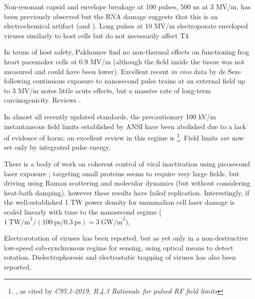 \documentclass[paper.tex]{subfiles}
\begin{document}
Non-resonant capsid and envelope breakage at 100 pulses, 500 ns at 3 MV/m, has been previously observed\cite{Inactivation1990} but the RNA damage suggests that this is an electrochemical artifact \cite{Formation1996} (and \cite{Microwave1987}). Long pulses at $10$ MV/m electroporate enveloped viruses similarly to host cells\cite{AC2017} but do not necessarily affect T4\cite{Manipulation2013}. 

In terms of host safety, Pakhomov \cite{Comparative} find no non-thermal effects on functioning frog heart pacemaker cells at 0.9 MV/m (although the field inside the tissue was not measured and could have been lower). Excellent recent \textit{in vivo} data by de Seze following continuous exposure to nanosecond pulse trains at an external field up to 3 MV/m \cite{Repeated2020} notes little acute effects, but a massive rate of long-term carcinogenicity. Reviews \cite{Penetration2016c} \cite{Effects2016}.

In almost all recently updated standards, the precautionary 100 kV/m instantaneous field limits established by ANSI have been abolished due to a lack of evidence of harm; an excellent review in this regime is \footnote{\cite{treatyelectromagnetic}, as cited by \textit{C95.1-2019, B.4.3 Rationale for pulsed RF field limits}}. Field limits are now set only by integrated pulse energy.

\cite{MICROWAVEINDUCED1975}

There is a body of work on coherent control of viral inactivation using picosecond laser exposure \cite{Maximum2010}; targeting small proteins seems to require very large fields\cite{Picosecond2016b}, but driving using Raman scattering \cite{Inactivation2007} \cite{Prospects2012}\cite{Studies2014} and molecular dynamics \cite{Maximum2010} (but without considering heat-bath damping). however these results have failed replication\cite{No2011}. Interestingly, if the well-established 1 TW power density\cite{Targeted2002} for mammalian cell laser damage is scaled linearly with time to the nanosecond regime ($1\ \text{TW/m}^2 / (100\ \text{ps} / 0.3\ \text{ps}) = 3\ \text{GW/m}^2$), 

\cite{Forced2000} Electrorotation\cite{RotatingFieldInduced1982}\cite{Electrorotation1988}\cite{Electrorotation1997} of viruses has been reported\cite{Analysis2004}\cite{New1999}\cite{comprehensive2001}, but as yet only in a non-destructive low-speed sub-synchronous regime for sensing, using optical means to detect rotation. Dielectrophoresis and electrostatic trapping of viruses has also been reported. 
\end{document}
